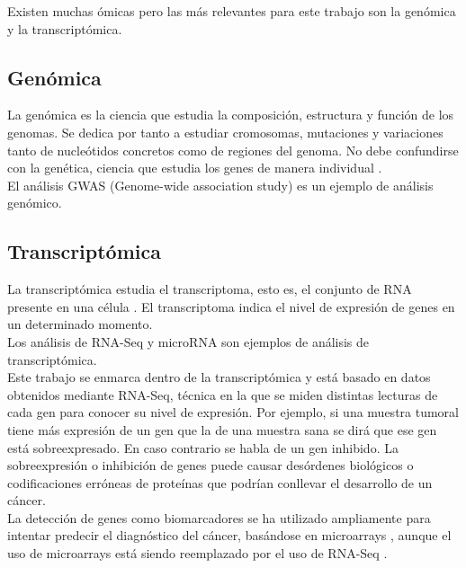 Existen muchas ómicas pero las más relevantes para este trabajo son la genómica y la transcriptómica.

\subsection{Genómica}

La genómica es la ciencia que estudia la composición, estructura y función de los genomas. Se dedica por tanto a estudiar cromosomas, mutaciones y variaciones tanto de nucleótidos concretos como de regiones del genoma. No debe confundirse con la genética, ciencia que estudia los genes de manera individual \cite{Pierce2010}.\\

El análisis GWAS (Genome-wide association study) es un ejemplo de análisis genómico.

\subsection{Transcriptómica}

La transcriptómica estudia el transcriptoma, esto es, el conjunto de RNA presente en una célula \cite{Schmidt2019}. El transcriptoma indica el nivel de expresión de genes en un determinado momento.\\

Los análisis de RNA-Seq y microRNA son ejemplos de análisis de transcriptómica.\\

Este trabajo se enmarca dentro de la transcriptómica y está basado en datos obtenidos mediante RNA-Seq, técnica en la que se miden distintas lecturas de cada gen para conocer su nivel de expresión. Por ejemplo, si una muestra tumoral tiene más expresión de un gen que la de una muestra sana se dirá que ese gen está sobreexpresado. En caso contrario se habla de un gen inhibido. La sobreexpresión o inhibición de genes puede causar desórdenes biológicos o codificaciones erróneas de proteínas que podrían conllevar el desarrollo de un cáncer.\\

La detección de genes como biomarcadores se ha utilizado ampliamente para intentar predecir el diagnóstico del cáncer, basándose en microarrays \cite{Lee2008, Maglietta2007}, aunque el uso de microarrays está siendo reemplazado por el uso de RNA-Seq  \cite{Stark2019, VanVerk2013}.
